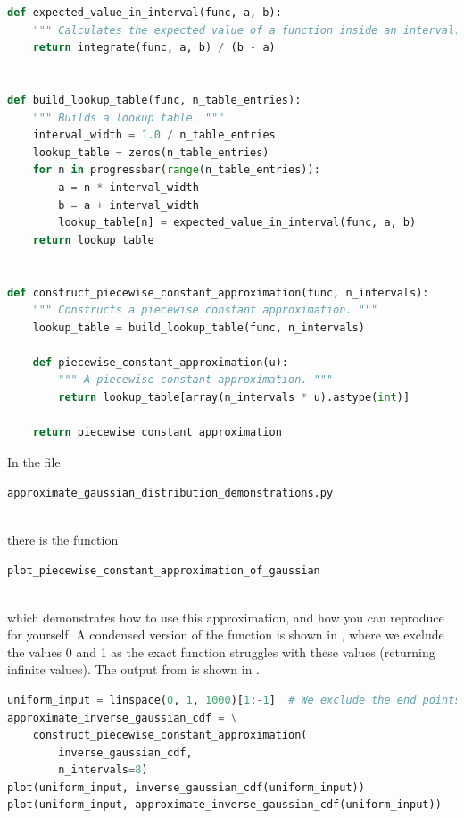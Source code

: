 \documentclass[11pt,a4paper,twoside,english]{extarticle}
\newcommand{\singlecodeline}[1]{\\[1em]\centerline{\lstinline[basicstyle=\ttfamily]$#1$}\\[1em]}
\begin{document}
\begin{lstfloat}[htb]
\begin{lstlisting}[language=python, captionpos=b, caption={Constructing a piecewise constant approximation.}, label={code:python:construct_piecewise_constant_approximation}]
def expected_value_in_interval(func, a, b):
    """ Calculates the expected value of a function inside an interval. """
    return integrate(func, a, b) / (b - a)


def build_lookup_table(func, n_table_entries):
    """ Builds a lookup table. """
    interval_width = 1.0 / n_table_entries
    lookup_table = zeros(n_table_entries)
    for n in progressbar(range(n_table_entries)):
        a = n * interval_width
        b = a + interval_width
        lookup_table[n] = expected_value_in_interval(func, a, b)
    return lookup_table


def construct_piecewise_constant_approximation(func, n_intervals):
    """ Constructs a piecewise constant approximation. """
    lookup_table = build_lookup_table(func, n_intervals)

    def piecewise_constant_approximation(u):
        """ A piecewise constant approximation. """
        return lookup_table[array(n_intervals * u).astype(int)]

    return piecewise_constant_approximation
\end{lstlisting}
\end{lstfloat}

In the file \singlecodeline{approximate_gaussian_distribution_demonstrations.py}
there is the function  
\singlecodeline{plot_piecewise_constant_approximation_of_gaussian}
which demonstrates how to use this approximation, and how you can reproduce  for yourself. A condensed version of the function is shown in , where we exclude the values 0 and 1 as the exact function struggles with these values (returning infinite values). The output from  is shown in .

\begin{lstfloat}[htb]
\begin{lstlisting}[language=python, captionpos=b, caption={Comparing the exact and approximate functions.}, label={code:python:plot_piecewise_constant_approximation_of_gaussian}]
uniform_input = linspace(0, 1, 1000)[1:-1]  # We exclude the end points.
approximate_inverse_gaussian_cdf = \
    construct_piecewise_constant_approximation(
        inverse_gaussian_cdf, 
        n_intervals=8)
plot(uniform_input, inverse_gaussian_cdf(uniform_input))
plot(uniform_input, approximate_inverse_gaussian_cdf(uniform_input))
\end{lstlisting}
\end{lstfloat}
\end{document}
